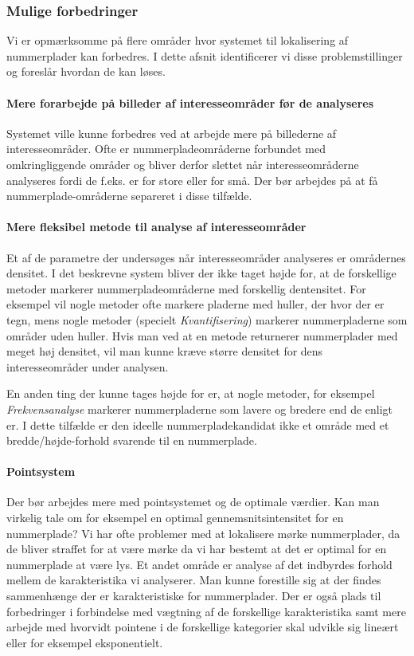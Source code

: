 \subsubsection{Mulige forbedringer}
Vi er opmærksomme på flere områder hvor systemet til lokalisering af nummerplader kan forbedres. I dette afsnit identificerer vi disse problemstillinger og foreslår hvordan de kan løses.

\paragraph{Mere forarbejde på billeder af interesseområder før de analyseres}
Systemet ville kunne forbedres ved at arbejde mere på billederne af interesseområder. Ofte er nummerpladeområderne forbundet med omkringliggende områder og bliver derfor slettet når interesseområderne analyseres fordi de f.eks. er for store eller for små. Der bør arbejdes på at få nummerplade-områderne separeret i disse tilfælde.

\paragraph{Mere fleksibel metode til analyse af interesseområder}
Et af de parametre der undersøges når interesseområder analyseres er områdernes densitet. I det beskrevne system bliver der ikke taget højde for, at de forskellige metoder markerer nummerpladeområderne med forskellig dentensitet. For eksempel vil nogle metoder ofte markere pladerne med huller, der hvor der er tegn, mens nogle metoder (specielt \textit{Kvantifisering}) markerer nummerpladerne som områder uden huller. Hvis man ved at en metode returnerer nummerplader med meget høj densitet, vil man kunne kræve større densitet for dens interesseområder under analysen.

En anden ting der kunne tages højde for er, at nogle metoder, for eksempel \textit{Frekvensanalyse} markerer nummerpladerne som lavere og bredere end de enligt er. I dette tilfælde er den ideelle nummerpladekandidat ikke et område med et bredde/højde-forhold svarende til en nummerplade.


\paragraph{Pointsystem}
Der bør arbejdes mere med pointsystemet og de optimale værdier. Kan man virkelig tale om for eksempel en optimal gennemsnitsintensitet for en nummerplade? Vi har ofte problemer med at lokalisere mørke nummerplader, da de bliver straffet for at være mørke da vi har bestemt at det er optimal for en nummerplade at være lys. Et andet område er analyse af det indbyrdes forhold mellem de karakteristika vi analyserer. Man kunne forestille sig at der findes sammenhænge der er karakteristiske for nummerplader. Der er også plads til forbedringer i forbindelse med vægtning af de forskellige karakteristika samt mere arbejde med hvorvidt pointene i de forskellige kategorier skal udvikle sig lineært eller for eksempel eksponentielt.

